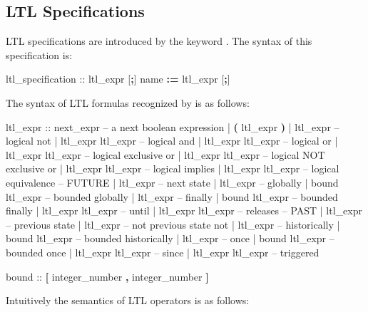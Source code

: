 \subsection{LTL Specifications}
\label{LTL Specifications}
%
LTL specifications are introduced by the keyword
. 
%
The syntax of this specification is:
%
\begin{Grammar}
ltl_specification ::  ltl_expr [\textbf{;}]
                       name \textbf{:=} ltl_expr [\textbf{;}]
\end{Grammar}
%
The syntax of LTL formulas recognized by \nusmv is as follows:
\begin{Grammar}
ltl_expr ::
    next_expr              -- a next boolean expression
    | \textbf{(} ltl_expr \textbf{)}
    | \operator{!} ltl_expr             -- logical not
    | ltl_expr \operator{\&} ltl_expr    -- logical and
    | ltl_expr \operator{|} ltl_expr    -- logical or
    | ltl_expr  ltl_expr  -- logical exclusive or
    | ltl_expr  ltl_expr -- logical NOT exclusive or
    | ltl_expr \operator{->} ltl_expr   -- logical implies
    | ltl_expr \operator{<->} ltl_expr  -- logical equivalence
    -- FUTURE
    |  ltl_expr             -- next state
    |  ltl_expr             -- globally
    |  bound ltl_expr       -- bounded globally
    |  ltl_expr             -- finally
    |  bound ltl_expr       -- bounded finally
    | ltl_expr  ltl_expr    -- until
    | ltl_expr  ltl_expr    -- releases
    -- PAST
    |  ltl_expr             -- previous state
    |  ltl_expr             -- not previous state not
    |  ltl_expr             -- historically
    |  bound ltl_expr       -- bounded historically
    |  ltl_expr             -- once 
    |  bound ltl_expr       -- bounded once
    | ltl_expr  ltl_expr    -- since
    | ltl_expr  ltl_expr    -- triggered

bound :: \textbf{[} integer_number \textbf{,} integer_number \textbf{]}
\end{Grammar}
%
Intuitively the semantics of LTL operators is as follows:
% 
